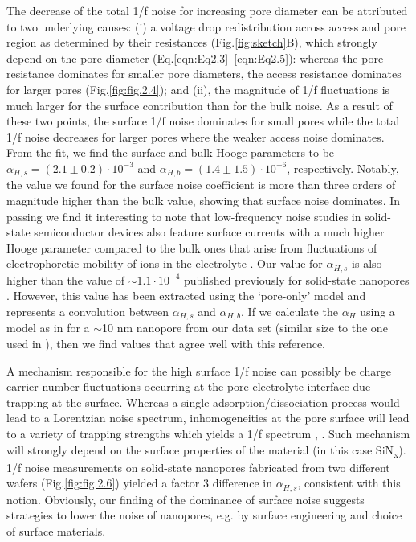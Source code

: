 The decrease of the total 1/f noise for increasing pore diameter can be attributed to two underlying causes: (i) a voltage drop redistribution across access and pore region as determined by their resistances (Fig.\ref{fig:sketch}B), which strongly depend on the pore diameter (Eq.\ref{eqn:Eq2.3}–\ref{eqn:Eq2.5}):  whereas the pore resistance dominates for smaller pore diameters, the access resistance dominates for larger pores (Fig.\ref{fig:fig.2.4}); and (ii), the magnitude of 1/f fluctuations is much larger for the surface contribution than for the bulk noise. As a result of these two points, the surface 1/f noise dominates for small pores while the total 1/f noise decreases for larger pores where the weaker access noise dominates. From the fit, we find the surface and bulk Hooge parameters to be $\alpha_{H,s}=(2.1\pm0.2)\cdot10^{-3}$ and $\alpha_{H,b}=(1.4\pm1.5)\cdot10^{-6}$, respectively. Notably, the value we found for the surface noise coefficient is more than three orders of magnitude higher than the bulk value, showing that surface noise dominates. In passing we find it interesting to note that low-frequency noise studies in solid-state semiconductor devices also feature surface currents with a much higher Hooge parameter compared to the bulk ones \cite{Vandamme1994} that arise from fluctuations of electrophoretic mobility of ions in the electrolyte \cite{Jindal1981}. Our value for $\alpha_{H,s}$ is also higher than the value of $\sim1.1\cdot10^{-4}$ published previously for solid-state nanopores \cite{Smeets2008}. However, this value has been extracted using the `pore-only' model and represents a convolution between $\alpha_{H,s}$ and $\alpha_{H,b}$. If we calculate the $\alpha_H$ using a model as in \cite{Smeets2008} for a $\sim$10 nm nanopore from our data set (similar size to the one used in \cite{Smeets2008}), then we find values that agree well with this reference. 


A mechanism responsible for the high surface 1/f noise can possibly be charge carrier number fluctuations occurring at the pore-electrolyte interface due trapping at the surface. Whereas a single adsorption/dissociation process would lead to a Lorentzian noise spectrum,  inhomogeneities at the pore surface will lead to a variety of trapping strengths which yields a 1/f spectrum \cite{Dutta1981}, \cite{Zhang2018}. Such mechanism will strongly depend on the surface properties of the material (in this case SiN\textsubscript{x}). 1/f noise measurements on solid-state nanopores fabricated from two different wafers (Fig.\ref{fig:fig.2.6}) yielded a factor 3 difference in $\alpha_{H,s}$, consistent with this notion. Obviously, our finding of the dominance of surface noise suggests strategies to lower the noise of nanopores, e.g. by surface engineering and choice of surface materials. 


